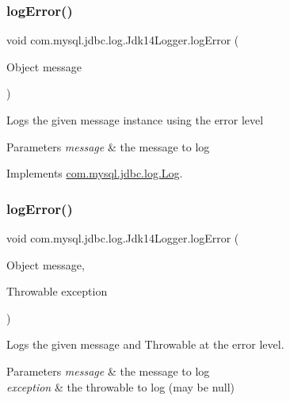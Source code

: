 \subsubsection{\texorpdfstring{log\+Error()}{logError()}\hspace{0.1cm}{\footnotesize\ttfamily [1/2]}}
{\footnotesize\ttfamily void com.\+mysql.\+jdbc.\+log.\+Jdk14\+Logger.\+log\+Error (\begin{DoxyParamCaption}\item[{Object}]{message }\end{DoxyParamCaption})}

Logs the given message instance using the \textquotesingle{}error\textquotesingle{} level


\begin{DoxyParams}{Parameters}
{\em message} & the message to log \\
\hline
\end{DoxyParams}


Implements \mbox{\hyperlink{interfacecom_1_1mysql_1_1jdbc_1_1log_1_1_log_aefe78baa37affef138eaba105b699022}{com.\+mysql.\+jdbc.\+log.\+Log}}.

\mbox{\label{classcom_1_1mysql_1_1jdbc_1_1log_1_1_jdk14_logger_a50ddfb22be744767635555b7d28333ff}} 
\subsubsection{\texorpdfstring{log\+Error()}{logError()}\hspace{0.1cm}{\footnotesize\ttfamily [2/2]}}
{\footnotesize\ttfamily void com.\+mysql.\+jdbc.\+log.\+Jdk14\+Logger.\+log\+Error (\begin{DoxyParamCaption}\item[{Object}]{message,  }\item[{Throwable}]{exception }\end{DoxyParamCaption})}

Logs the given message and Throwable at the \textquotesingle{}error\textquotesingle{} level.


\begin{DoxyParams}{Parameters}
{\em message} & the message to log \\
\hline
{\em exception} & the throwable to log (may be null) \\
\hline
\end{DoxyParams}


